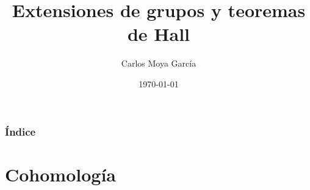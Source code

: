 \documentclass[
	11pt, %
]{beamer}
\title[]{Extensiones de grupos y teoremas de Hall} %
\author{Carlos Moya García} %
\institute[]{Universidad del País Vasco} %
\date{\today} %
\begin{document}

\begin{frame}
	\titlepage %
\end{frame}



\begin{frame}
	\frametitle{Índice} %
	
	\tableofcontents %
\end{frame}


\section{Cohomología}
\end{document}

